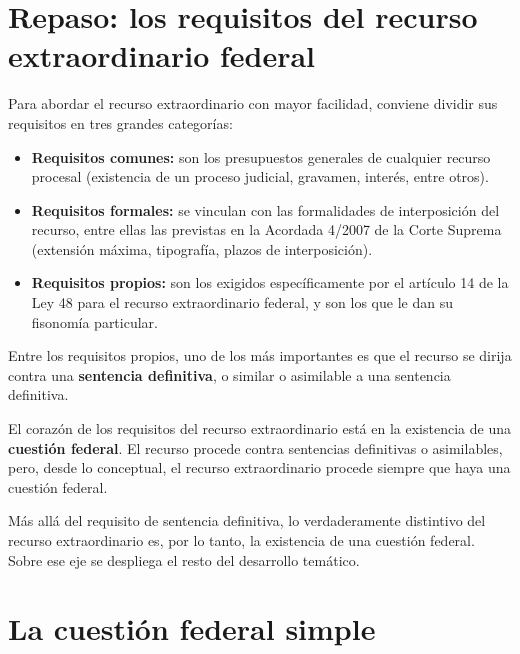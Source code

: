 \documentclass[12pt,oneside]{book}
\begin{document}
\section{Repaso: los requisitos del recurso extraordinario federal}
\label{sec:requisitos}

Para abordar el recurso extraordinario con mayor facilidad, conviene dividir sus requisitos en tres grandes categorías:

\begin{itemize}
    \item \textbf{Requisitos comunes:} son los presupuestos generales de cualquier recurso procesal (existencia de un proceso judicial, gravamen, interés, entre otros).
    \item \textbf{Requisitos formales:} se vinculan con las formalidades de interposición del recurso, entre ellas las previstas en la Acordada 4/2007 de la Corte Suprema (extensión máxima, tipografía, plazos de interposición).
    \item \textbf{Requisitos propios:} son los exigidos específicamente por el artículo 14 de la Ley 48 para el recurso extraordinario federal, y son los que le dan su fisonomía particular.
\end{itemize}

Entre los requisitos propios, uno de los más importantes es que el recurso se dirija contra una \textbf{sentencia definitiva}, o similar o asimilable a una sentencia definitiva.

\begin{important}
El corazón de los requisitos del recurso extraordinario está en la existencia de una \textbf{cuestión federal}. El recurso procede contra sentencias definitivas o asimilables, pero, desde lo conceptual, el recurso extraordinario procede siempre que haya una cuestión federal.
\end{important}

Más allá del requisito de sentencia definitiva, lo verdaderamente distintivo del recurso extraordinario es, por lo tanto, la existencia de una cuestión federal. Sobre ese eje se despliega el resto del desarrollo temático.

\section{La cuestión federal simple}
\label{sec:simple}
\end{document}
